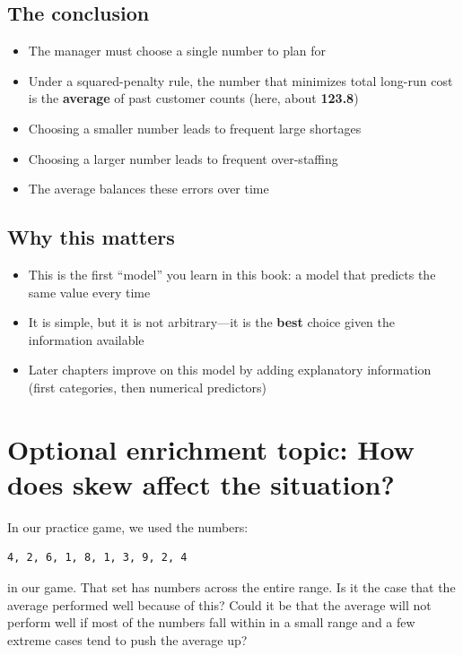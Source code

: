 \documentclass[
  12pt,
  letterpaper,
  DIV=11,
  numbers=noendperiod]{scrreprt}
\providecommand{\tightlist}{%
  \setlength{\itemsep}{0pt}\setlength{\parskip}{0pt}}
\begin{document}
\subsection{The conclusion}\label{the-conclusion}

\begin{itemize}
\tightlist
\item
  The manager must choose a single number to plan for
\item
  Under a squared-penalty rule, the number that minimizes total long-run
  cost is the \textbf{average} of past customer counts (here, about
  \textbf{123.8})
\item
  Choosing a smaller number leads to frequent large shortages
\item
  Choosing a larger number leads to frequent over-staffing
\item
  The average balances these errors over time
\end{itemize}

\subsection{Why this matters}\label{why-this-matters}

\begin{itemize}
\tightlist
\item
  This is the first ``model'' you learn in this book: a model that
  predicts the same value every time
\item
  It is simple, but it is not arbitrary---it is the \textbf{best} choice
  given the information available
\item
  Later chapters improve on this model by adding explanatory information
  (first categories, then numerical predictors)
\end{itemize}

\section{Optional enrichment topic: How does skew affect the
situation?}\label{optional-enrichment-topic-how-does-skew-affect-the-situation}

In our practice game, we used the numbers:

\begin{lstlisting}
4, 2, 6, 1, 8, 1, 3, 9, 2, 4
\end{lstlisting}

in our game. That set has numbers across the entire range. Is it the
case that the average performed well because of this? Could it be that
the average will not perform well if most of the numbers fall within in
a small range and a few extreme cases tend to push the average up?
\end{document}
